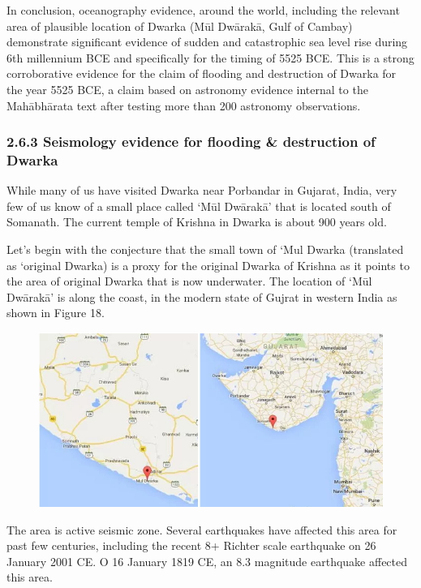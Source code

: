 In conclusion, oceanography evidence, around the world, including the relevant area of plausible location of Dwarka (Mūl Dwārakā, Gulf of Cambay) demonstrate significant evidence of sudden and catastrophic sea level rise during 6th millennium BCE and specifically for the timing of 5525 BCE. This is a strong corroborative evidence for the claim of flooding and destruction of Dwarka for the year 5525 BCE, a claim based on astronomy evidence internal to the Mahābhārata text after testing more than 200 astronomy observations.


\subsubsection*{2.6.3 Seismology evidence for flooding \& destruction of Dwarka}

While many of us have visited Dwarka near Porbandar in Gujarat, India, very few of us know of a small place called ‘Mūl Dwārakā’ that is located south of Somanath. The current temple of Krishna in Dwarka is about 900 years old.

Let’s begin with the conjecture that the small town of ‘Mul Dwarka (translated as ‘original Dwarka) is a proxy for the original Dwarka of Krishna as it points to the area of original Dwarka that is now underwater. The location of ‘Mūl Dwārakā’ is along the coast, in the modern state of Gujrat in western India as shown in Figure 18.

\begin{figure}[!htbp]
\includegraphics[scale=0.4]{"images/8-18.jpg"}
\caption{}\label{art8-fig18}
\end{figure}

The area is active seismic zone. Several earthquakes have affected this area for past few centuries, including the recent 8+ Richter scale earthquake on 26 January 2001 CE. O 16 January 1819 CE, an 8.3 magnitude earthquake affected this area.

